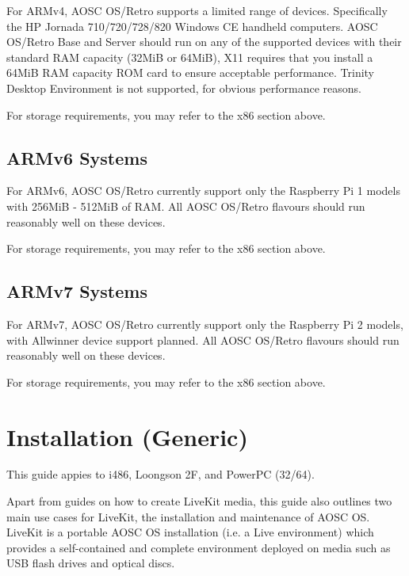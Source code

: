     For ARMv4, AOSC OS/Retro supports a limited range of devices.
    Specifically the HP Jornada 710/720/728/820 Windows CE handheld computers.
    AOSC OS/Retro Base and Server should run on any of the supported devices with their standard RAM capacity (32MiB or 64MiB),
    X11 requires that you install a 64MiB RAM capacity ROM card to ensure acceptable performance.
    Trinity Desktop Environment is not supported, for obvious performance reasons.

    For storage requirements, you may refer to the x86 section above.

    \section{ARMv6 Systems}

    For ARMv6, AOSC OS/Retro currently support only the Raspberry Pi 1 models
    with 256MiB - 512MiB of RAM. All AOSC OS/Retro flavours should run reasonably well on these devices.

    For storage requirements, you may refer to the x86 section above.

    \section{ARMv7 Systems}

    For ARMv7, AOSC OS/Retro currently support only the Raspberry Pi 2 models,
    with Allwinner device support planned.
    All AOSC OS/Retro flavours should run reasonably well on these devices.

    For storage requirements, you may refer to the x86 section above.







    \chapter{Installation (Generic)}

    This guide appies to i486, Loongson 2F, and PowerPC (32/64).

    Apart from guides on how to create LiveKit media, this guide also outlines two main use cases for LiveKit,
    the installation and maintenance of AOSC OS.
    LiveKit is a portable AOSC OS installation (i.e. a Live environment) which provides a self-contained
    and complete environment deployed on media such as USB flash drives and optical discs.


